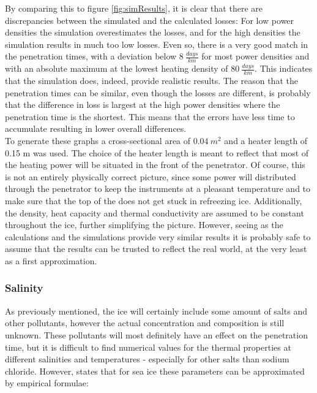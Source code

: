 \noindent
By comparing this to figure \ref{fig:simResults}, it is clear that there are discrepancies between the simulated and the calculated losses: For low power densities the simulation overestimates the losses, and for the high densities the simulation results in much too low losses. Even so, there is a very good match in the penetration times, with a deviation below $\SI{8}{\frac{days}{km}}$ for most power densities and with an absolute maximum at the lowest heating density of  $\SI{80}{\frac{days}{km}}$. This indicates that the simulation does, indeed, provide realistic results. The reason that the penetration times can be similar, even though the losses are different, is probably that the difference in loss is largest at the high power densities where the penetration time is the shortest. This means that the errors have less time to accumulate resulting in lower overall differences.\\

\noindent
To generate these graphs a cross-sectional area of $\SI{0.04}{m^2}$ and a heater length of 0.15 m was used. The choice of the heater length is meant to reflect that most of the heating power will be situated in the front of the penetrator. Of course, this is not an entirely physically correct picture, since some power will distributed through the penetrator to keep the instruments at a pleasant temperature and to make sure that the top of the does not get stuck in refreezing ice. Additionally, the density, heat capacity and thermal conductivity are assumed to be constant throughout the ice, further simplifying the picture. However, seeing as the calculations and the simulations provide very similar results it is probably safe to assume that the results can be trusted to reflect the real world, at the very least as a first approximation.\\

\subsubsection{Salinity} \label{sec:iceSalinity}
As previously mentioned, the ice will certainly include some amount of salts and other pollutants, however the actual concentration and composition is still unknown. These pollutants will most definitely have an effect on the penetration time, but it is difficult to find numerical values for the thermal properties at different salinities and temperatures - especially for other salts than sodium chloride. However, \citet{book:thomas2009sea} states that for sea ice these parameters can be approximated by empirical formulae:\\

